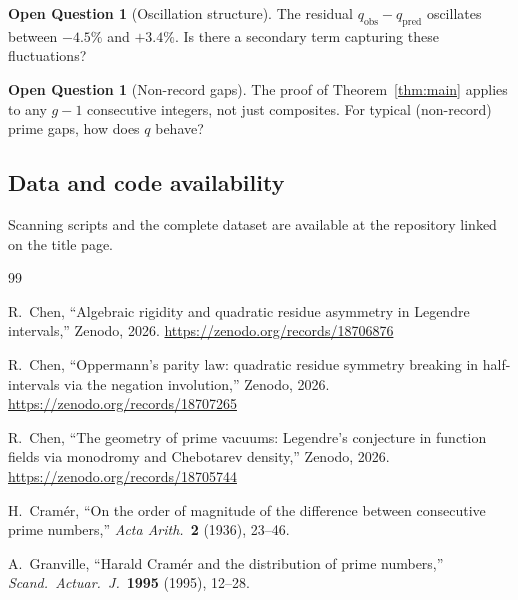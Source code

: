 \documentclass[11pt, a4paper]{article}
\theoremstyle{definition}
\newtheorem{question}[theorem]{Open Question}
\theoremstyle{remark}
\begin{document}
\begin{question}[Oscillation structure]\label{q:oscillation}
The residual $q_{\mathrm{obs}} - q_{\mathrm{pred}}$
oscillates between $-4.5\%$ and $+3.4\%$.
Is there a secondary term capturing these fluctuations?
\end{question}

\begin{question}[Non-record gaps]\label{q:nonrecord}
The proof of Theorem~\ref{thm:main} applies to any
$g - 1$ consecutive integers, not just composites.
For typical (non-record) prime gaps, how does $q$
behave?
\end{question}

\subsection*{Data and code availability}

Scanning scripts and the complete dataset are available at
the repository linked on the title page.

\begin{thebibliography}{99}

  R.~Chen,
  ``Algebraic rigidity and quadratic residue asymmetry
  in Legendre intervals,''
  Zenodo, 2026.
  \url{https://zenodo.org/records/18706876}

  R.~Chen,
  ``Oppermann's parity law: quadratic residue symmetry
  breaking in half-intervals via the negation involution,''
  Zenodo, 2026.
  \url{https://zenodo.org/records/18707265}

  R.~Chen,
  ``The geometry of prime vacuums: Legendre's conjecture
  in function fields via monodromy and Chebotarev density,''
  Zenodo, 2026.
  \url{https://zenodo.org/records/18705744}

  H.~Cram\'er,
  ``On the order of magnitude of the difference between
  consecutive prime numbers,''
  \textit{Acta Arith.}\ \textbf{2} (1936), 23--46.

  A.~Granville,
  ``Harald Cram\'er and the distribution of prime numbers,''
  \textit{Scand.\ Actuar.\ J.}\ \textbf{1995} (1995), 12--28.

\end{thebibliography}
\end{document}
